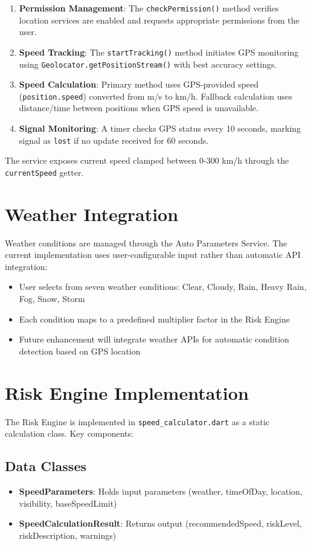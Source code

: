 \begin{enumerate}
    \item \textbf{Permission Management}: The \texttt{checkPermission()} method verifies location services are enabled and requests appropriate permissions from the user.
    \item \textbf{Speed Tracking}: The \texttt{startTracking()} method initiates GPS monitoring using \texttt{Geolocator.getPositionStream()} with best accuracy settings.
    \item \textbf{Speed Calculation}: Primary method uses GPS-provided speed (\texttt{position.speed}) converted from m/s to km/h. Fallback calculation uses distance/time between positions when GPS speed is unavailable.
    \item \textbf{Signal Monitoring}: A timer checks GPS status every 10 seconds, marking signal as \texttt{lost} if no update received for 60 seconds.
\end{enumerate}

The service exposes current speed clamped between 0-300 km/h through the \texttt{currentSpeed} getter.

\section{Weather Integration}
Weather conditions are managed through the Auto Parameters Service. The current implementation uses user-configurable input rather than automatic API integration:

\begin{itemize}
    \item User selects from seven weather conditions: Clear, Cloudy, Rain, Heavy Rain, Fog, Snow, Storm
    \item Each condition maps to a predefined multiplier factor in the Risk Engine
    \item Future enhancement will integrate weather APIs for automatic condition detection based on GPS location
\end{itemize}

\section{Risk Engine Implementation}
The Risk Engine is implemented in \texttt{speed\_calculator.dart} as a static calculation class. Key components:

\subsection{Data Classes}
\begin{itemize}
    \item \textbf{SpeedParameters}: Holds input parameters (weather, timeOfDay, location, visibility, baseSpeedLimit)
    \item \textbf{SpeedCalculationResult}: Returns output (recommendedSpeed, riskLevel, riskDescription, warnings)
\end{itemize}


